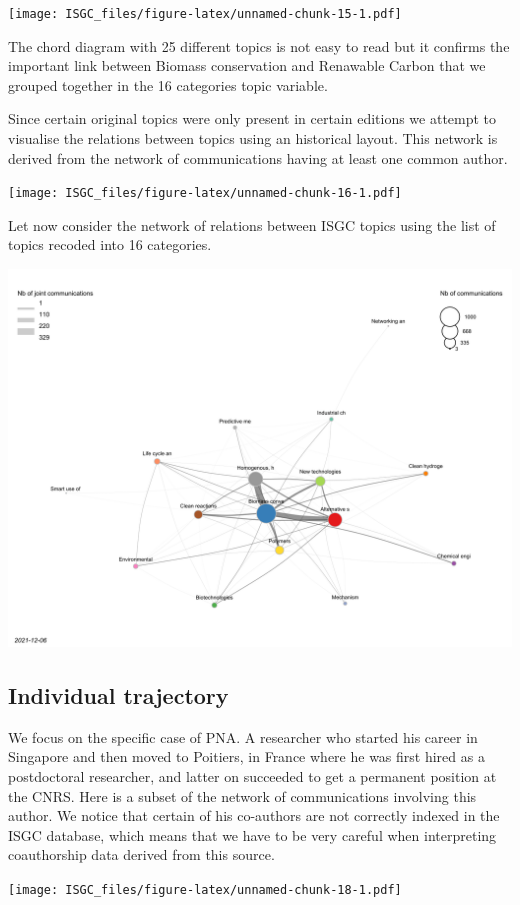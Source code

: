\documentclass[
]{article}
\begin{document}
\texttt{[image: ISGC\_files/figure-latex/unnamed-chunk-15-1.pdf]}

The chord diagram with 25 different topics is not easy to read but it
confirms the important link between Biomass conservation and Renawable
Carbon that we grouped together in the 16 categories topic variable.

Since certain original topics were only present in certain editions we
attempt to visualise the relations between topics using an historical
layout. This network is derived from the network of communications
having at least one common author.

\texttt{[image: ISGC\_files/figure-latex/unnamed-chunk-16-1.pdf]}

Let now consider the network of relations between ISGC topics using the
list of topics recoded into 16 categories.

\includegraphics{plots/Topics_network_recoded_cartigraph.svg}

\hypertarget{individual-trajectory}{%
\subsection{Individual trajectory}\label{individual-trajectory}}

We focus on the specific case of PNA. A researcher who started his
career in Singapore and then moved to Poitiers, in France where he was
first hired as a postdoctoral researcher, and latter on succeeded to get
a permanent position at the CNRS. Here is a subset of the network of
communications involving this author. We notice that certain of his
co-authors are not correctly indexed in the ISGC database, which means
that we have to be very careful when interpreting coauthorship data
derived from this source.

\texttt{[image: ISGC\_files/figure-latex/unnamed-chunk-18-1.pdf]}
\end{document}
